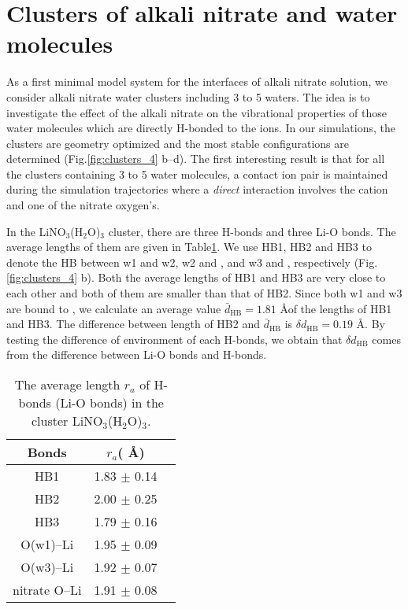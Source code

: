   \section{Clusters of alkali nitrate and water molecules}\label{paragraph_clusters_alkali_nitrate_and_water_molecules}
  As a first minimal model system for the interfaces of alkali nitrate solution, we consider alkali nitrate water clusters including 3 to 5 waters. 
  The idea is to investigate the effect of the alkali nitrate on the vibrational properties of those water molecules which are directly 
  H-bonded to the ions.
  In our simulations, the clusters are geometry optimized and the most stable configurations are determined (Fig.\thinspace\ref{fig:clusters_4} b--d).
  The first interesting result is that for all the clusters containing 3 to 5 water molecules, a contact ion pair is maintained during the 
  simulation trajectories where a \emph{direct} interaction involves the cation and one of the nitrate oxygen's. 

In the LiNO$_3$(H$_2$O)$_3$ cluster, there are three H-bonds and three Li-O bonds. 
The average lengths of them are given in Table\thinspace\ref{tab:table_lino3}. 
We use HB1, HB2 and HB3 to denote the HB between w1 and w2, w2 and \nitrate, and w3 and \nitrate, 
respectively (Fig.\thinspace\ref{fig:clusters_4} b). Both the average lengths of HB1 and HB3 are very close 
to each other and both of them are smaller than that of HB2. 
Since both w1 and w3 are bound to \li, we calculate an average value $\bar{d}_{\text{HB}}=1.81$ \AA of the lengths of HB1 and HB3.
The difference between length of HB2 and $\bar{d}_{\text{HB}}$ is $\delta d_{\text{HB}}=0.19$ \AA.
By testing the difference of environment of each H-bonds,  we obtain that $\delta d_{\text{HB}}$ comes from the 
difference between Li-O bonds and H-bonds.
\begin{table}[htbp]
\centering
\caption{\label{tab:table_lino3}%
  The average length $r_a$ of H-bonds (Li-O bonds) in the cluster LiNO$_3$(H$_2$O)$_3$.}
\begin{tabular}{ccc}
Bonds& $r_a$( \AA) \\ 
\hline
HB1 &1.83 $\pm$ 0.14\\
HB2 &2.00 $\pm$ 0.25 \\
HB3 &1.79 $\pm$ 0.16 \\
O(w1)--Li &1.95 $\pm$ 0.09 \\
O(w3)--Li &1.92 $\pm$ 0.07 \\
nitrate O--Li &1.91 $\pm$ 0.08
\end{tabular}
\end{table}

